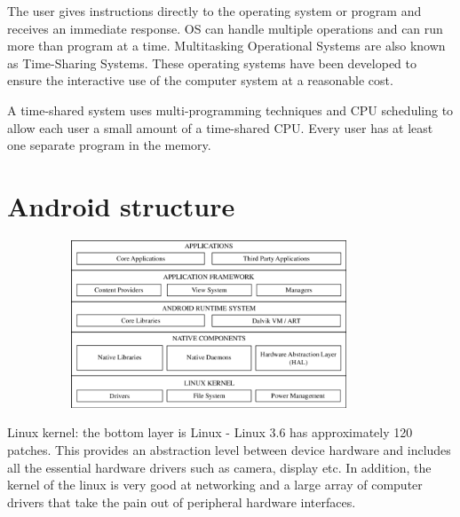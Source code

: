\documentclass[preprint,12pt]{elsarticle}
\begin{document}
The user gives instructions directly to the operating system or program and receives an immediate response. OS can handle multiple operations and can run more than program at a time. Multitasking Operational Systems are also known as Time-Sharing Systems. These operating systems have been developed to ensure the interactive use of the computer system at a reasonable cost. 

A time-shared system uses multi-programming techniques and CPU scheduling to allow each user a small amount of a time-shared CPU. Every user has at least one separate program in the memory.\cite{7}




\section{\large{Android structure}}
\label{S:2}

\includegraphics[width=12cm, height=5cm]{Android Operating System Architecture.png}

Linux kernel:
the bottom layer is Linux - Linux 3.6 has approximately 120 patches. This provides an abstraction level between device hardware and includes all the essential hardware drivers such as camera, display etc. In addition, the kernel of the linux is very good at networking and a large array of computer drivers that take the pain out of peripheral hardware interfaces.
\end{document}
